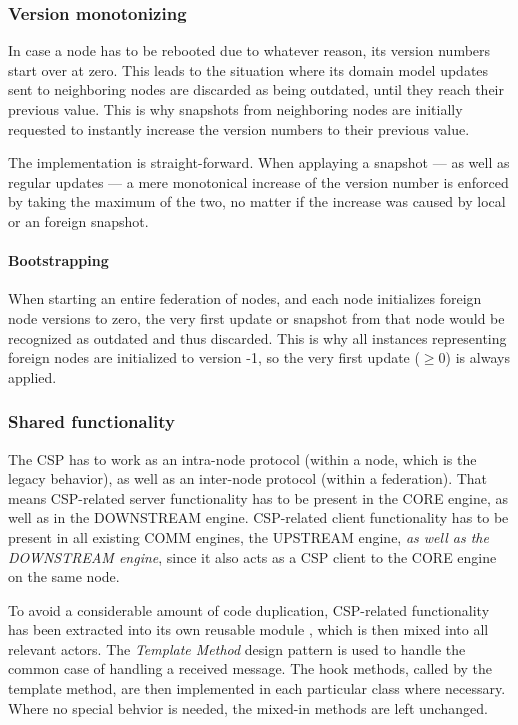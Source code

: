 

\subsubsection{Version monotonizing}
In case a node has to be rebooted due to whatever reason, its version numbers
start over at zero.
This leads to the situation where its domain model updates sent to neighboring
nodes are discarded as being outdated, until they reach their previous value.
This is why snapshots from neighboring nodes are initially requested to
instantly increase the version numbers to their previous value.

The implementation is straight-forward. When applaying a snapshot --- as well as regular
updates --- a mere monotonical increase of the version number is enforced by
taking the maximum of the two, no matter if the increase was caused by local or
an foreign snapshot.

\paragraph{Bootstrapping}
When starting an entire federation of nodes, and each node initializes foreign
node versions to zero, the very first update or snapshot from that node would
be recognized as outdated and thus discarded. This is why all
 instances representing foreign nodes are
initialized to version -1, so the very first update ($\geqslant 0$) is always
applied.

\subsubsection{Shared functionality}
The \gls{CSP} has to work as an intra-node protocol (within a node, which is
the legacy behavior), as well as an inter-node protocol (within a federation).
That means \gls{CSP}-related server functionality has to be present in the CORE
engine, as well as in the DOWNSTREAM engine. CSP-related client functionality has
to be present in all existing COMM engines, the UPSTREAM engine, \emph{as well
as the DOWNSTREAM engine}, since it also acts as a CSP client to the CORE engine on
the same node.

To avoid a considerable amount of code duplication, CSP-related functionality
has been extracted into its own reusable module , which is then mixed into all
relevant actors. The \emph{Template Method} design pattern is used to handle
the common case of handling a received
 message. The hook methods,
called by the template method, are then implemented
in each particular class where necessary. Where no special behvior is needed,
the mixed-in methods are left unchanged.

